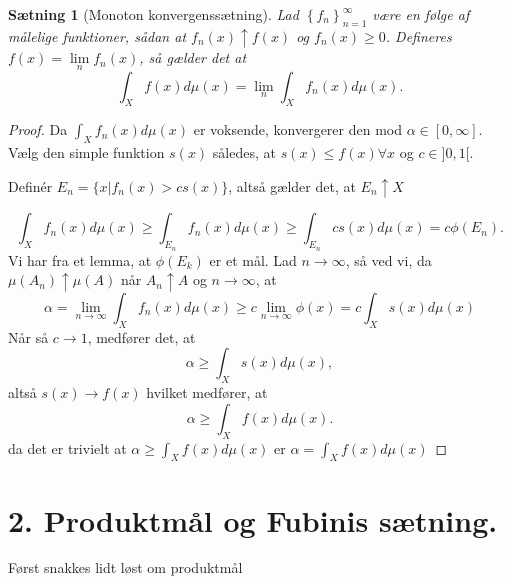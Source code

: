 \documentclass[12pt]{report}
\newtheorem{theorem}[lemma]{Sætning}
\theoremstyle{break}
\newtheorem*{proof}{Bevis}
\theoremstyle{break}
\newcommand{\1}{\mathds{1}}
\begin{document}
\begin{theorem}[Monoton konvergenssætning]
	Lad $\left\{ f_n \right\}_{n=1}^\infty$ være en følge af målelige funktioner, sådan at $f_n(x)\uparrow f(x)$ og $f_n(x)\geq 0$. Defineres $f(x)= \lim\limits_{n}f_n(x)$, så gælder det at
	\[ \int_X f(x)d\mu (x)=\lim\limits_{n}\int_X f_n(x)d\mu (x).\]
\end{theorem}
\begin{proof}
	Da $\int_X f_n(x)d\mu(x)$ er voksende, konvergerer den mod $\alpha \in [0,\infty]$. Vælg den simple funktion $s(x)$ således, at $s(x)\leq f(x) \forall x$ og $c\in ]0,1[$.
	
	\bigskip
	
	Definér $E_n=\{x|f_n(x)>cs(x)\}$, altså gælder det, at $E_n\uparrow X$
	
	\bigskip
	
	\[\int_X f_n(x)d\mu(x)\geq \int_{E_n}f_n(x)d\mu(x) \geq \int_{E_n}cs(x)d\mu(x)=c\phi(E_n).\]
	Vi har fra et lemma, at $\phi(E_k)$ er et mål.
	Lad $n\to \infty$, så ved vi, da $\mu (A_n)\uparrow\mu(A)$ når $A_n\uparrow A$ og $n\to \infty$, at 
	\[ \alpha=\lim\limits_{n\to\infty}\int_X f_n(x)d\mu(x)\geq c\lim\limits_{n\to\infty}\phi(x)=c\int_Xs(x) d\mu(x) \]
	Når så $c\to 1$, medfører det, at
	\[ \alpha \geq \int_X s(x) d\mu(x), \]
	altså $s(x)\to f(x)$ hvilket medfører, at
	\[ \alpha \geq \int_X f(x) d\mu(x). \]
	da det er trivielt at $\alpha \geq \int_X f(x)d\mu(x)$ er $\alpha = \int_X f(x) d\mu(x)$
\end{proof}
\newpage

\section*{2. Produktmål og Fubinis sætning.}
Først snakkes lidt løst om produktmål

\bigskip
\end{document}
